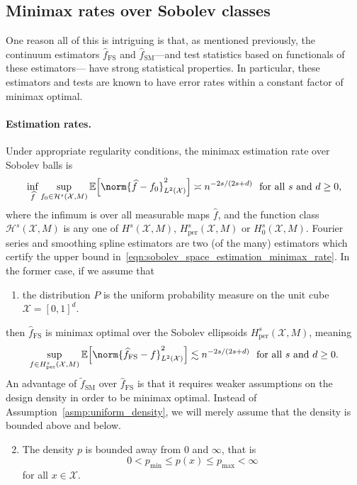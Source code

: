 \documentclass{article}
\newcommand{\1}{\mathbf{1}}
\newcommand{\Xset}{\mathcal{X}}
\newcommand{\mc}[1]{\mathcal{#1}}
\newcommand{\Ebb}{\mathbb{E}}
\newcommand{\wt}[1]{\widetilde{#1}}
\newcommand{\wh}[1]{\widehat{#1}}
\newcommand{\SM}{\mathrm{SM}}
\newcommand{\OS}{\mathrm{FS}}
\theoremstyle{alden}
\theoremstyle{aldenthm}
\theoremstyle{definition}
\theoremstyle{remark}
\begin{document}
\subsection{Minimax rates over Sobolev classes}
\label{subsec:minimax_rates}
One reason all of this is intriguing is that, as mentioned previously, the continuum estimators $\wh{f}_{\OS}$ and $\wh{f}_{\SM}$---and test statistics based on functionals of these estimators--- have strong statistical properties. In particular, these estimators and tests are known to have error rates within a constant factor of minimax optimal.

\paragraph{Estimation rates.}
Under appropriate regularity conditions, the minimax estimation rate over Sobolev balls is 
\begin{equation}
\label{eqn:sobolev_space_estimation_minimax_rate}
\inf_{\wh{f}} \sup_{f_0 \in \mc{H}^s(\Xset, M)} \Ebb\Bigl[\norm{\wh{f} - f_0}_{L^2(\Xset)}^2\Bigr] \asymp n^{-2s/(2s + d)}~~\textrm{for all $s$ and $d \geq 0$,}
\end{equation}
where the infimum is over all measurable maps $\wh{f}$, and the function class $\mc{H}^s(\Xset,M)$ is any one of $H^s(\Xset,M)$, $H_{\mathrm{per}}^s(\Xset,M)$ or $H_0^s(\Xset,M)$. Fourier series and smoothing spline estimators are two (of the many) estimators which certify the upper bound in~\eqref{eqn:sobolev_space_estimation_minimax_rate}. In the former case, if we assume that
\begin{enumerate}[label=(P\arabic*)]
	\item
	\label{asmp:uniform_density}
	the distribution $P$ is the uniform probability measure on the unit cube $\Xset = [0,1]^d$.
\end{enumerate}
then $\wh{f}_{\OS}$ is minimax optimal over the Sobolev ellipsoids $H_{\mathrm{per}}^s(\Xset, M)$, meaning
\begin{equation*}
\sup_{f \in H_{\mathrm{per}}^s(\Xset,M)}\Ebb\Bigl[\norm{\wh{f}_{\OS} - f}_{L^2(\Xset)}^2\Bigr]  \lesssim n^{-2s/(2s + d)}~~\textrm{for all $s$ and $d \geq 0$.}
\end{equation*}
An advantage of $\wt{f}_{\SM}$ over $\wh{f}_{\OS}$ is that it requires weaker assumptions on the design density in order to be minimax optimal. Instead of Assumption~\ref{asmp:uniform_density}, we will merely assume that the density is bounded above and below.
\begin{enumerate}[label=(P\arabic*)]
	\setcounter{enumi}{1}
	\item 
	\label{asmp:bounded_density}
	The density $p$ is bounded away from $0$ and $\infty$, that is
	\begin{equation*}
	0 < p_{\min} \leq p(x) \leq p_{\max} < \infty
	\end{equation*}
	for all $x \in \Xset$.
\end{enumerate}
\end{document}
